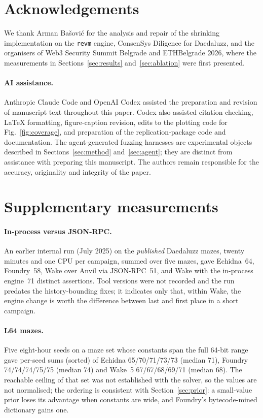 \documentclass[11pt,a4paper]{article}
\newcommand{\wake}{Wake}
\newcommand{\revm}{\texttt{revm}}
\begin{document}
\section*{Acknowledgements}

We thank Arman Ba\v{s}ovi\'{c} for the analysis and repair of the shrinking implementation on the \revm{} engine, ConsenSys Diligence for Daedaluzz, and the organisers of Web3 Security Summit Belgrade and ETHBelgrade 2026, where the measurements in Sections~\ref{sec:results} and~\ref{sec:ablation} were first presented.

\paragraph{AI assistance.}

Anthropic Claude Code and OpenAI Codex assisted the preparation and revision of manuscript text throughout this paper. Codex also assisted citation checking, LaTeX formatting, figure-caption revision, edits to the plotting code for Fig.~\ref{fig:coverage}, and preparation of the replication-package code and documentation. The agent-generated fuzzing harnesses are experimental objects described in Sections~\ref{sec:method} and~\ref{sec:agent}; they are distinct from assistance with preparing this manuscript. The authors remain responsible for the accuracy, originality and integrity of the paper.




\appendix
\section{Supplementary measurements}
\label{sec:supplementary}

\paragraph{In-process versus JSON-RPC.} An earlier internal run (July 2025) on the \emph{published} Daedaluzz mazes, twenty minutes and one CPU per campaign, summed over five mazes, gave Echidna~64, Foundry~58, \wake{} over Anvil via JSON-RPC~51, and \wake{} with the in-process engine~71 distinct assertions. Tool versions were not recorded and the run predates the history-bounding fixes; it indicates only that, within \wake{}, the engine change is worth the difference between last and first place in a short campaign.

\paragraph{L64 mazes.} Five eight-hour seeds on a maze set whose constants span the full 64-bit range gave per-seed sums (sorted) of Echidna 65/70/71/73/73 (median 71), Foundry 74/74/74/75/75 (median 74) and \wake{}~5 67/67/68/69/71 (median 68). The reachable ceiling of that set was not established with the solver, so the values are not normalised; the ordering is consistent with Section~\ref{sec:prior}: a small-value prior loses its advantage when constants are wide, and Foundry's bytecode-mined dictionary gains one.
\end{document}
